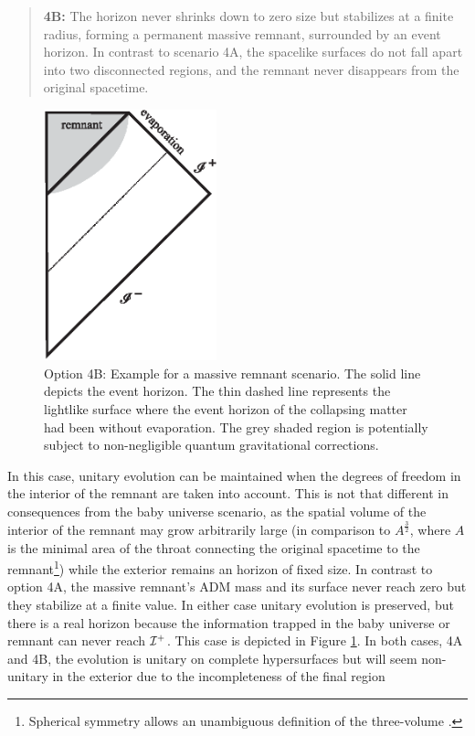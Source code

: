 \documentclass[12pt]{article}
\begin{document}
\begin{quotation}

{\bf 4B:} The horizon never shrinks down to zero size but stabilizes at a finite radius, forming a permanent massive remnant, surrounded by an event horizon. In contrast to scenario 4A, the spacelike surfaces do not fall apart into two
disconnected regions, and the remnant never disappears from the original spacetime. 

\end{quotation}

\begin{figure}[ht]
\centering \includegraphics[width=5cm]{evap4.eps}

\caption{Option 4B: Example for a massive remnant scenario. The solid line depicts the event horizon. The thin dashed line represents the lightlike surface where the event horizon of the collapsing matter 
had been without evaporation. The grey shaded 
region is potentially subject to non-negligible quantum gravitational corrections.  
\label{fig4}}
\end{figure}


In this case, unitary evolution can be maintained when the degrees of freedom in the interior of the remnant are taken into account. This is not that different in consequences from the baby universe scenario, as the spatial volume of the interior of the remnant may grow arbitrarily large (in comparison to $A^{\frac{3}{2}}$, where $A$ is the minimal area of the throat connecting the original spacetime to the remnant\footnote{Spherical symmetry allows an unambiguous definition
of the three-volume \cite{Wald}.}) while the exterior remains an horizon of fixed size. In contrast to option 4A, the massive remnant's ADM mass and its surface never reach
zero but they stabilize at a finite value. In either case unitary evolution is preserved, but there is a real horizon because the information trapped in the baby universe or remnant can never reach ${\cal I}^+$. This case is depicted in Figure \ref{fig4}. In both cases, 4A and 4B, the evolution
is unitary on complete hypersurfaces but will seem non-unitary in the exterior due to the incompleteness of the final region
\end{document}

